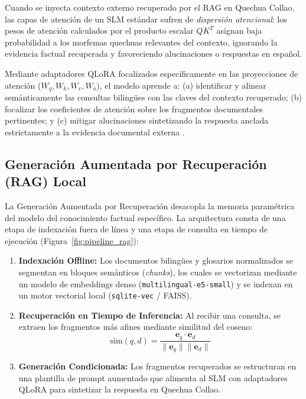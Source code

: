 Cuando se inyecta contexto externo recuperado por el RAG en Quechua Collao, las capas de atención de un SLM estándar sufren de \textit{dispersión atencional}: los pesos de atención calculados por el producto escalar $Q K^T$ asignan baja probabilidad a los morfemas quechuas relevantes del contexto, ignorando la evidencia factual recuperada y favoreciendo alucinaciones o respuestas en español.

Mediante adaptadores QLoRA focalizados específicamente en las proyecciones de atención ($W_q, W_k, W_v, W_o$), el modelo aprende a: (a) identificar y alinear semánticamente las consultas bilingües con las claves del contexto recuperado; (b) focalizar los coeficientes de atención sobre los fragmentos documentales pertinentes; y (c) mitigar alucinaciones sintetizando la respuesta anclada estrictamente a la evidencia documental externa \citep{Ovadia2024}.

\subsection{Generación Aumentada por Recuperación (RAG) Local}
La Generación Aumentada por Recuperación desacopla la memoria paramétrica del modelo del conocimiento factual específico. La arquitectura consta de una etapa de indexación fuera de línea y una etapa de consulta en tiempo de ejecución (Figura~\ref{fig:pipeline_rag}):
\begin{enumerate}
    \item \textbf{Indexación Offline:} Los documentos bilingües y glosarios normalizados se segmentan en bloques semánticos (\textit{chunks}), los cuales se vectorizan mediante un modelo de embeddings denso (\texttt{multilingual-e5-small}) y se indexan en un motor vectorial local (\texttt{sqlite-vec} / FAISS).
    \item \textbf{Recuperación en Tiempo de Inferencia:} Al recibir una consulta, se extraen los fragmentos más afines mediante similitud del coseno:
    $$\text{sim}(q, d) = \frac{\mathbf{e}_q \cdot \mathbf{e}_d}{\|\mathbf{e}_q\| \|\mathbf{e}_d\|}$$
    \item \textbf{Generación Condicionada:} Los fragmentos recuperados se estructuran en una plantilla de prompt aumentado que alimenta al SLM con adaptadores QLoRA para sintetizar la respuesta en Quechua Collao.
\end{enumerate}

